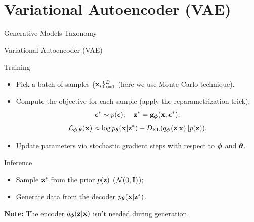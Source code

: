 \documentclass{beamer}
\begin{document}
\section{Variational Autoencoder (VAE)}
\begin{frame}{Generative Models Taxonomy}
\end{frame}
\begin{frame}{Variational Autoencoder (VAE)}
	\begin{block}{Training}
		\begin{itemize}
			\item Pick a batch of samples \{$\mathbf{x}_i\}_{i=1}^B$ (here we use Monte Carlo technique).
			\eqpause
			\item Compute the objective for each sample (apply the reparametrization trick):
			\vspace{-0.3cm}
			\[
				\boldsymbol{\epsilon}^* \sim p(\boldsymbol{\epsilon}); \quad \mathbf{z}^* = \mathbf{g}_{\boldsymbol{\phi}}(\mathbf{x}, \boldsymbol{\epsilon}^*);
			\]
			\[
				\mathcal{L}_{\boldsymbol{\phi}, \boldsymbol{\theta}}(\mathbf{x}) \approx  \log p_{\boldsymbol{\theta}}(\mathbf{x} | \mathbf{z}^*) - D_\mathrm{KL}(q_{\boldsymbol{\phi}}(\mathbf{z}| \mathbf{x}) \| p(\mathbf{z})).
			\]
			\eqpause
			\vspace{-0.5cm}
			\item Update parameters via stochastic gradient steps with respect to $\boldsymbol{\phi}$ and $\boldsymbol{\theta}$.
		\end{itemize}
	\end{block}
	\eqpause
	\begin{block}{Inference}
		\begin{itemize}
			\item Sample $\mathbf{z}^*$ from the prior $p(\mathbf{z})$ ($\mathcal{N}(0, \mathbf{I})$);
			\eqpause
			\item Generate data from the decoder $p_{\boldsymbol{\theta}}(\mathbf{x} | \mathbf{z}^*)$.
		\end{itemize}
	\end{block}
	\eqpause
	\textbf{Note:} The encoder $q_{\boldsymbol{\phi}}(\mathbf{z}| \mathbf{x})$ isn't needed during generation.
\end{frame}
\end{document}
